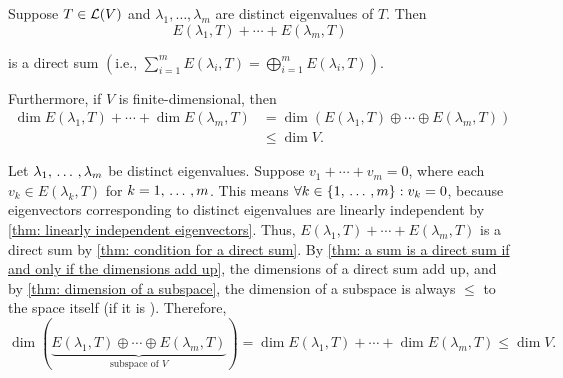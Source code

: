\setcounter{thm}{53}
\begin{thm} 
  \label{thm: sum of eigenspaces is a direct sum}
  Suppose $T\in \mathcal{L} (V)$ and $\lambda_1, \dots, \lambda_m$ are distinct eigenvalues of $T$. Then
  \begin{equation}
    E(\lambda_1, T) + \cdots + E(\lambda_m, T)
  \end{equation}

  is a direct sum $\left(\text{i.e., } \sum_{i=1}^{m} E(\lambda_i, T) = \bigoplus_{i=1}^{m} E(\lambda_i, T)\right)$.

  Furthermore, if $V$ is finite-dimensional, then
  \begin{equation}
    \begin{aligned}
      \dim E(\lambda_1, T) + \cdots + \dim E(\lambda_m, T)
      & = \dim \left( E(\lambda_1, T)  \oplus \cdots \oplus E(\lambda_m, T) \right) \\
      & \leq \dim V.
    \end{aligned}
  \end{equation}
\end{thm}
\begin{prf}
  Let $\lambda_1, {\, \ldots \,\,}, \lambda_m$ be distinct eigenvalues. Suppose $v_1 + \cdots + v_m = 0$, where each $v_k \in E(\lambda_k, T)$ for $k = 1, {\, \ldots \,\,}, m$. This means $\forall k \in \{ 1, {\, \ldots \,\,}, m\}: v_k = 0$, because eigenvectors corresponding to distinct eigenvalues are linearly independent by \ref{thm: linearly independent eigenvectors}. Thus, $E(\lambda_1, T) + \cdots + E(\lambda_m, T)$ is a direct sum by \ref{thm: condition for a direct sum}.
  By \ref{thm: a sum is a direct sum if and only if the dimensions add up}, the dimensions of a direct sum add up, and by \ref{thm: dimension of a subspace}, the dimension of a subspace is always $\leq$ to the space itself (if it is \fd). Therefore,
  \begin{equation}
    \dim \left( \underbrace{E(\lambda_1, T)  \oplus \cdots \oplus E(\lambda_m, T)}_{\text{subspace of $V$}} \right)
    =  \dim E(\lambda_1, T) + \cdots + \dim E(\lambda_m, T) \leq \dim V.
  \end{equation}
  \vspace{-1em}
\end{prf}

